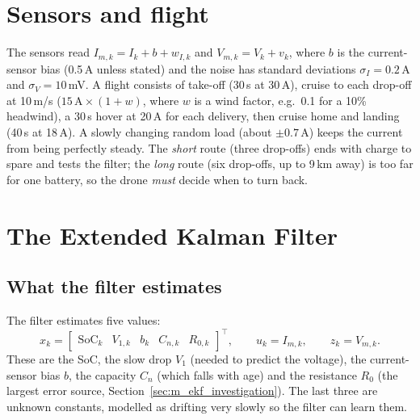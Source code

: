 \section{Sensors and flight}\label{sec:m_sensors}\label{sec:m_mission}

The sensors read $I_{m,k} = I_k + b + w_{I,k}$ and $V_{m,k} = V_k + v_k$, where $b$ is the current-sensor bias (0.5\,A unless stated) and the noise has standard deviations $\sigma_I = 0.2$\,A and $\sigma_V = 10$\,mV.\label{eq:m_sensor_i} A flight consists of take-off (30\,s at 30\,A), cruise to each drop-off at 10\,m/s ($15\,\text{A} \times (1 + w)$, where $w$ is a wind factor, e.g.\ 0.1 for a 10\% headwind), a 30\,s hover at 20\,A for each delivery, then cruise home and landing (40\,s at 18\,A). \label{eq:m_wobble}A slowly changing random load (about $\pm 0.7$\,A) keeps the current from being perfectly steady. The \emph{short} route (three drop-offs) ends with charge to spare and tests the filter; the \emph{long} route (six drop-offs, up to 9\,km away) is too far for one battery, so the drone \emph{must} decide when to turn back.

\section{The Extended Kalman Filter}\label{sec:m_ekf}

\subsection{What the filter estimates}\label{sec:m_ekf_states}\label{sec:m_ekf_process}\label{sec:m_ekf_measurement}

The filter estimates five values:
\begin{equation}
  x_k = \begin{bmatrix} \mathrm{SoC}_k & V_{1,k} & b_k & C_{n,k} & R_{0,k} \end{bmatrix}^{\top}, \qquad u_k = I_{m,k}, \qquad z_k = V_{m,k}.
  \label{eq:m_state}
\end{equation}
These are the SoC, the slow drop $V_1$ (needed to predict the voltage), the current-sensor bias $b$, the capacity $C_n$ (which falls with age) and the resistance $R_0$ (the largest error source, Section~\ref{sec:m_ekf_investigation}). The last three are unknown constants, modelled as drifting very slowly so the filter can learn them.

